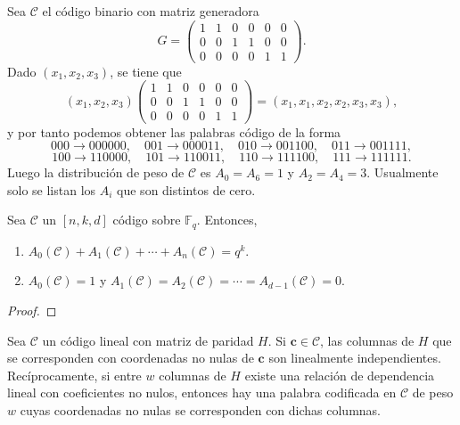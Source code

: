 \begin{example}
  Sea \(\mathcal C\) el código binario con matriz generadora
  \[
    G = \begin{pmatrix}
      1 & 1 & 0 & 0 & 0 & 0\\
      0 & 0 & 1 & 1 & 0 & 0 \\
      0 & 0 & 0 & 0 & 1 & 1
    \end{pmatrix}.
  \]
  Dado \((x_1, x_2, x_3)\), se tiene que \[(x_1, x_2, x_3) \begin{pmatrix}
    1 & 1 & 0 & 0 & 0 & 0\\
      0 & 0 & 1 & 1 & 0 & 0 \\
      0 & 0 & 0 & 0 & 1 & 1
  \end{pmatrix} = (x_1, x_1, x_2, x_2, x_3, x_3),\] y por tanto podemos obtener las palabras código de la forma 
  \[
    000 \to 000000, \quad 
    001 \to 000011,\quad 
    010 \to 001100,\quad 
    011 \to 001111,
  \]
  \[
    100 \to 110000, \quad 
    101 \to 110011,\quad 
    110 \to 111100,\quad 
    111 \to 111111.
  \]
  Luego la distribución de peso de \(\mathcal C\) es \(A_0 = A_6 = 1\) y \(A_2 = A_4 = 3\).
  Usualmente solo se listan los \(A_i\) que son distintos de cero.
\end{example}

\begin{theorem}
  Sea \(\mathcal C\) un \([n,k,d]\) código sobre \(\mathbb F_q\).
  Entonces, \begin{enumerate}
    \item \(A_0(\mathcal C) + A_1(\mathcal C) + \cdots + A_n(\mathcal C) = q^k\).
    \item \(A_0(\mathcal C) = 1\) y \(A_1(\mathcal C) = A_2(\mathcal C) = \cdots = A_{d-1}(\mathcal C) = 0\).
  \end{enumerate}
\end{theorem}

\begin{proof}
  
\end{proof}


\begin{theorem}
  Sea \(\mathcal C\) un código lineal con matriz de paridad \(H\). Si \(\symbf{c} \in \mathcal C\), las columnas de \(H\) que se corresponden con coordenadas no nulas de \(\symbf{c}\) son linealmente independientes.
  Recíprocamente, si entre \(w\) columnas de \(H\) existe una relación de dependencia lineal con coeficientes no nulos, entonces hay una palabra codificada en \(\mathcal C\) de peso \(w\) cuyas coordenadas no nulas se corresponden con dichas columnas.
\end{theorem}

